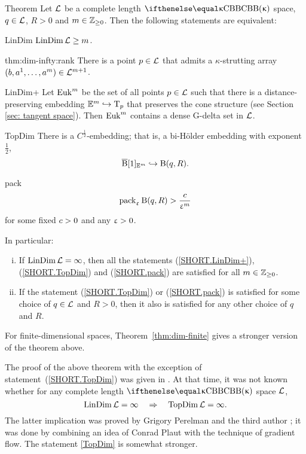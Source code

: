 \begin{thm}{Theorem}\label{thm:dim-infty}
Let $\mathcal{L}$ be a complete length $\Alex{\kappa}$ space, 
$q\in \spc{L}$, 
$R>0$ 
and $m\in \ZZ_{\ge0}$.
Then the following statements are equivalent:
\begin{subthmA}{LinDim}  $\LinDim\spc{L}\ge m$.
\end{subthmA}

\begin{subthmA}{thm:dim-infty:rank}
There is a point $p\in\spc{L}$ that admits a $\kappa$-strutting array $(b,a^1,\dots,a^m)\in\spc{L}^{m+1}$.
\end{subthmA}

\begin{subthmA}{LinDim+} Let $\mathop{\rm Euk}\nolimits^m$ be the set 
of all points $p\in \spc{L}$ such that there is a distance-preserving embedding $\EE^m\hookrightarrow \T_p$
that preserves the cone structure 
(see Section  \ref{sec: tangent space}).
Then $\mathop{\rm Euk}\nolimits^m$  contains a dense G-delta set in $\mathcal{L}$.
\end{subthmA}

\begin{subthmA}{TopDim} There is a $C^{\frac{1}{2}}$-embedding; that is, a bi-H\"older embedding with exponent $\tfrac{1}{2}$,
\[\cBall[1]_{\EE^m}\hookrightarrow \oBall(q,R).\]
\end{subthmA}

\begin{subthmA}{pack} 
\[\mathop{\rm pack}\nolimits_\upvarepsilon \mathrm{B}{}(q,R)>\frac{c}{\upvarepsilon^m}\]
for some fixed $c>0$ and any $\upvarepsilon>0$.
\end{subthmA}

\medskip

In particular:
\begin{enumerate}[(i)]
\item If $\mathop{\rm LinDim}\nolimits\mathcal{L}=\infty$, then all the statements (\ref{SHORT.LinDim+}), (\ref{SHORT.TopDim}) and (\ref{SHORT.pack}) are satisfied for all $m\in\ZZ_{\ge0}$. 
\item 
 If the statement (\ref{SHORT.TopDim}) or (\ref{SHORT.pack}) is satisfied for some choice of $q\in \spc{L}$ and $R>0$, then it also is satisfied for any other choice of $q$ and $R$.
\end{enumerate}
\end{thm}

For finite-dimensional spaces, Theorem~\ref{thm:dim-finite} gives a stronger version 
of the theorem above.

The proof of the above theorem with the exception of  statement~(\ref{SHORT.TopDim}) was given in \cite{plaut:dimension}.
At that time, it was not known whether for any complete length $\Alex\kappa$ space $\mathcal{L}$,
\[\mathop{\rm LinDim}\nolimits\mathcal{L}=\infty\quad \Rightarrow\quad \mathop{\rm TopDim}\nolimits\mathcal{L}=\infty.\]
The latter implication was proved by Grigory Perelman and the third author \cite{perelman-petrunin:qg};
it was done by combining an idea of Conrad Plaut with the technique of gradient flow.
The statement \ref{TopDim} is somewhat stronger.


